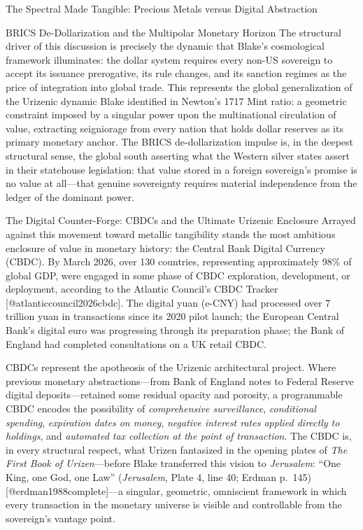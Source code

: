 \documentclass[
  ignorenonframetext,
]{beamer}
\begin{document}
\begin{frame}{The Spectral Made Tangible: Precious Metals versus Digital
Abstraction}
\begin{block}{BRICS De-Dollarization and the Multipolar Monetary
Horizon}
The structural driver of this discussion is precisely the dynamic that
Blake's cosmological framework illuminates: the dollar system requires
every non-US sovereign to accept its issuance prerogative, its rule
changes, and its sanction regimes as the price of integration into
global trade. This represents the global generalization of the Urizenic
dynamic Blake identified in Newton's 1717 Mint ratio: a geometric
constraint imposed by a singular power upon the multinational
circulation of value, extracting seigniorage from every nation that
holds dollar reserves as its primary monetary anchor. The BRICS
de-dollarization impulse is, in the deepest structural sense, the global
south asserting what the Western silver states assert in their
statehouse legislation: that value stored in a foreign sovereign's
promise is no value at all---that genuine sovereignty requires material
independence from the ledger of the dominant power.
\end{block}

\begin{block}{The Digital Counter-Forge: CBDCs and the Ultimate Urizenic
Enclosure}
\protect{}\label{the-digital-counter-forge-cbdcs-and-the-ultimate-urizenic-enclosure}
Arrayed against this movement toward metallic tangibility stands the
most ambitious enclosure of value in monetary history: the Central Bank
Digital Currency (CBDC). By March 2026, over 130 countries, representing
approximately 98\% of global GDP, were engaged in some phase of CBDC
exploration, development, or deployment, according to the Atlantic
Council's CBDC Tracker {[}@atlanticcouncil2026cbdc{]}. The digital yuan
(e-CNY) had processed over 7 trillion yuan in transactions since its
2020 pilot launch; the European Central Bank's digital euro was
progressing through its preparation phase; the Bank of England had
completed consultations on a UK retail CBDC.

CBDCs represent the apotheosis of the Urizenic architectural project.
Where previous monetary abstractions---from Bank of England notes to
Federal Reserve digital deposits---retained some residual opacity and
porosity, a programmable CBDC encodes the possibility of
\emph{comprehensive surveillance}, \emph{conditional spending},
\emph{expiration dates on money}, \emph{negative interest rates applied
directly to holdings}, and \emph{automated tax collection at the point
of transaction}. The CBDC is, in every structural respect, what Urizen
fantasized in the opening plates of \emph{The First Book of
Urizen}---before Blake transferred this vision to \emph{Jerusalem}:
``One King, one God, one Law'' (\emph{Jerusalem}, Plate 4, line 40;
Erdman p.~145) {[}@erdman1988complete{]}---a singular, geometric,
omniscient framework in which every transaction in the monetary universe
is visible and controllable from the sovereign's vantage point.


\end{block}
\end{frame}
\end{document}
